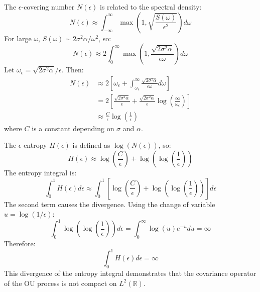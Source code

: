 \documentclass{article}
\begin{document}
The $\epsilon$-covering number $N (\epsilon)$ is related to the spectral
density:
\begin{equation}
  N (\epsilon) \approx \int_{- \infty}^{\infty} \max \left( 1, \sqrt{\frac{S
  (\omega)}{\epsilon^2}} \right) d \omega
\end{equation}
For large $\omega$, $S (\omega) \sim 2 \sigma^2 \alpha / \omega^2$, so:
\begin{equation}
  N (\epsilon) \approx 2 \int_0^{\infty} \max \left( 1, \frac{\sqrt{2 \sigma^2
  \alpha}}{\epsilon \omega} \right) d \omega
\end{equation}
Let $\omega_{\epsilon} = \sqrt{2 \sigma^2 \alpha} / \epsilon$. Then:
\begin{equation}
  \begin{array}{ll}
    N (\epsilon) & \approx 2 \left[ \omega_{\epsilon} +
    \int_{\omega_{\epsilon}}^{\infty} \frac{\sqrt{2 \sigma^2 \alpha}}{\epsilon
    \omega} d \omega \right]\\
    & = 2 \left[ \frac{\sqrt{2 \sigma^2 \alpha}}{\epsilon} + \frac{\sqrt{2
    \sigma^2 \alpha}}{\epsilon} \log \left( \frac{\infty}{\omega_{\epsilon}}
    \right) \right]\\
    & \approx \frac{C}{\epsilon} \log \left( \frac{1}{\epsilon} \right)
  \end{array}
\end{equation}
where $C$ is a constant depending on $\sigma$ and $\alpha$.

The $\epsilon$-entropy $H (\epsilon)$ is defined as $\log (N (\epsilon))$, so:
\begin{equation}
  H (\epsilon) \approx \log \left( \frac{C}{\epsilon} \right) + \log \left(
  \log \left( \frac{1}{\epsilon} \right) \right)
\end{equation}
The entropy integral is:
\begin{equation}
  \int_0^1 H (\epsilon) d \epsilon \approx \int_0^1 \left[ \log \left(
  \frac{C}{\epsilon} \right) + \log \left( \log \left( \frac{1}{\epsilon}
  \right) \right) \right] d \epsilon
\end{equation}
The second term causes the divergence. Using the change of variable $u = \log
(1 / \epsilon)$:
\begin{equation}
  \int_0^1 \log \left( \log \left( \frac{1}{\epsilon} \right) \right) d
  \epsilon = \int_0^{\infty} \log (u) e^{- u} du = \infty
\end{equation}
Therefore:
\begin{equation}
  \int_0^1 H (\epsilon) d \epsilon = \infty
\end{equation}
This divergence of the entropy integral demonstrates that the covariance
operator of the OU process is not compact on $L^2 (\mathbb{R})$.
\end{document}
